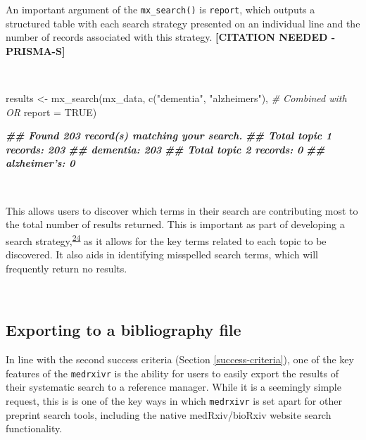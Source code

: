 \documentclass[a4paper, twoside]{templates/ociamthesis}
\newenvironment{Shaded}{\begin{snugshade}}{\end{snugshade}}
\newcommand{\AttributeTok}[1]{\textcolor[rgb]{0.77,0.63,0.00}{#1}}
\newcommand{\CommentTok}[1]{\textcolor[rgb]{0.56,0.35,0.01}{\textit{#1}}}
\newcommand{\ConstantTok}[1]{\textcolor[rgb]{0.00,0.00,0.00}{#1}}
\newcommand{\DocumentationTok}[1]{\textcolor[rgb]{0.56,0.35,0.01}{\textbf{\textit{#1}}}}
\newcommand{\FunctionTok}[1]{\textcolor[rgb]{0.00,0.00,0.00}{#1}}
\newcommand{\NormalTok}[1]{#1}
\newcommand{\OtherTok}[1]{\textcolor[rgb]{0.56,0.35,0.01}{#1}}
\newcommand{\StringTok}[1]{\textcolor[rgb]{0.31,0.60,0.02}{#1}}
\renewenvironment{Shaded}
{
  \vspace{4pt}%
  \begin{snugshade}%
}{%
  \end{snugshade}%
  \vspace{4pt}%
}
\begin{document}
An important argument of the \texttt{mx\_search()} is \texttt{report}, which outputs a structured table with each search strategy presented on an individual line and the number of records associated with this strategy. \textbf{{[}CITATION NEEDED - PRISMA-S{]}}

~

\begin{Shaded}
\begin{Highlighting}[]
\NormalTok{results  }\OtherTok{\textless{}{-}} \FunctionTok{mx\_search}\NormalTok{(mx\_data,}
                      \FunctionTok{c}\NormalTok{(}\StringTok{"dementia"}\NormalTok{, }\StringTok{"alzheimer\textquotesingle{}s"}\NormalTok{), }\CommentTok{\# Combined with OR}
                      \AttributeTok{report =} \ConstantTok{TRUE}\NormalTok{)}
\end{Highlighting}
\end{Shaded}

\begin{Shaded}
\begin{Highlighting}[]
\DocumentationTok{\#\# Found 203 record(s) matching your search.}
\DocumentationTok{\#\# Total topic 1 records: 203}
\DocumentationTok{\#\# dementia: 203}
\DocumentationTok{\#\# Total topic 2 records: 0}
\DocumentationTok{\#\# alzheimer’s: 0}
\end{Highlighting}
\end{Shaded}

~

This allows users to discover which terms in their search are contributing most to the total number of results returned. This is important as part of developing a search strategy,\textsuperscript{\protect\hyperlink{ref-bramer2018}{24}} as it allows for the key terms related to each topic to be discovered. It also aids in identifying misspelled search terms, which will frequently return no results.

~

\hypertarget{exporting-to-a-bibliography-file}{%
\subsection{Exporting to a bibliography file}\label{exporting-to-a-bibliography-file}}

In line with the second success criteria (Section \ref{success-criteria}), one of the key features of the \texttt{medrxivr} is the ability for users to easily export the results of their systematic search to a reference manager. While it is a seemingly simple request, this is is one of the key ways in which \texttt{medrxivr} is set apart for other preprint search tools, including the native medRxiv/bioRxiv website search functionality.
\end{document}
